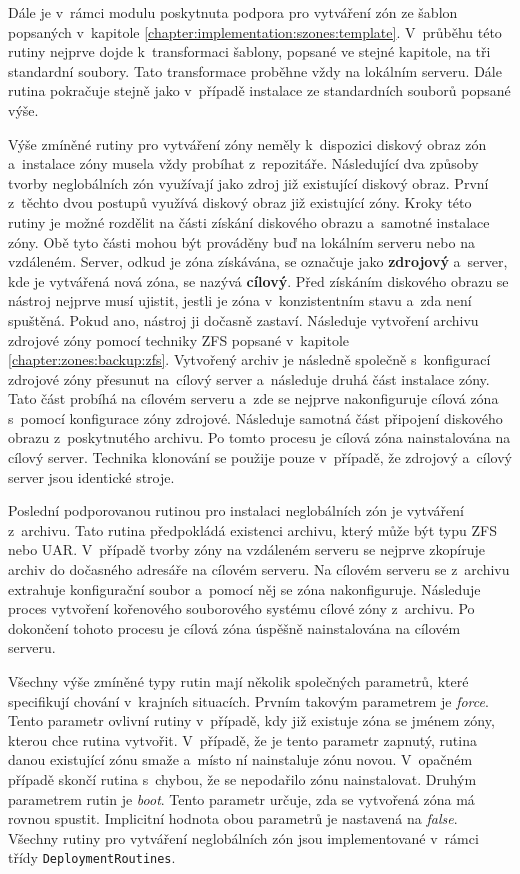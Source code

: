 Dále je v~rámci modulu poskytnuta podpora pro vytváření zón ze šablon popsaných v~kapitole \ref{chapter:implementation:szones:template}. 
V~průběhu této rutiny nejprve dojde k~transformaci šablony, popsané ve stejné kapitole, na tři standardní soubory. Tato transformace
proběhne vždy na lokálním serveru. Dále rutina pokračuje stejně jako v~případě instalace ze standardních souborů popsané výše.

Výše zmíněné rutiny pro vytváření zóny neměly k~dispozici diskový obraz zón a~instalace zóny musela vždy probíhat z~repozitáře.
Následující dva způsoby tvorby neglobálních zón využívají jako zdroj již existující diskový obraz. První z~těchto dvou postupů
využívá diskový obraz již existující zóny. Kroky této rutiny je možné rozdělit na části získání diskového obrazu a~samotné instalace
zóny. Obě tyto části mohou být prováděny buď na lokálním serveru nebo na vzdáleném. Server, odkud je zóna získávána, se označuje
jako \textbf{zdrojový} a~server, kde je vytvářená nová zóna, se nazývá \textbf{cílový}. Před získáním diskového obrazu se 
nástroj nejprve musí ujistit, jestli je zóna v~konzistentním stavu a~zda není spuštěná. Pokud ano, nástroj ji dočasně zastaví.
Následuje vytvoření archivu zdrojové zóny pomocí techniky ZFS popsané v~kapitole \ref{chapter:zones:backup:zfs}. Vytvořený archiv je
následně společně s~konfigurací zdrojové zóny přesunut na~cílový server a~následuje druhá část instalace zóny. Tato část probíhá na
cílovém serveru a~zde se nejprve nakonfiguruje cílová zóna s~pomocí konfigurace zóny zdrojové. Následuje samotná část připojení
diskového obrazu z~poskytnutého archivu. Po tomto procesu je cílová zóna nainstalována na cílový server. Technika klonování
se použije pouze v~případě, že zdrojový a~cílový server jsou identické stroje.

Poslední podporovanou rutinou pro instalaci neglobálních zón je vytváření z~archivu. Tato rutina předpokládá existenci archivu,
který může být typu ZFS nebo UAR. V~případě tvorby
zóny na vzdáleném serveru se nejprve zkopíruje archiv do dočasného adresáře na cílovém serveru. Na cílovém serveru se z~archivu
extrahuje konfigurační soubor a~pomocí něj se zóna nakonfiguruje. Následuje proces vytvoření kořenového souborového systému cílové
zóny z~archivu. Po dokončení tohoto procesu je cílová zóna úspěšně nainstalována na cílovém serveru.

Všechny výše zmíněné typy rutin mají několik společných parametrů, které specifikují chování v~krajních situacích. Prvním
takovým parametrem je \textit{force}. Tento parametr ovlivní rutiny v~případě, kdy již existuje zóna se jménem zóny, kterou
chce rutina vytvořit. V~případě, že je tento parametr zapnutý, rutina danou existující zónu smaže a~místo ní nainstaluje
zónu novou. V~opačném případě skončí rutina s~chybou, že se nepodařilo zónu nainstalovat. Druhým parametrem rutin je \textit{boot}.
Tento parametr určuje, zda se vytvořená zóna má rovnou spustit. Implicitní hodnota obou parametrů je nastavená na \textit{false}.
Všechny rutiny pro vytváření neglobálních zón jsou implementované v~rámci třídy \verb|DeploymentRoutines|.
